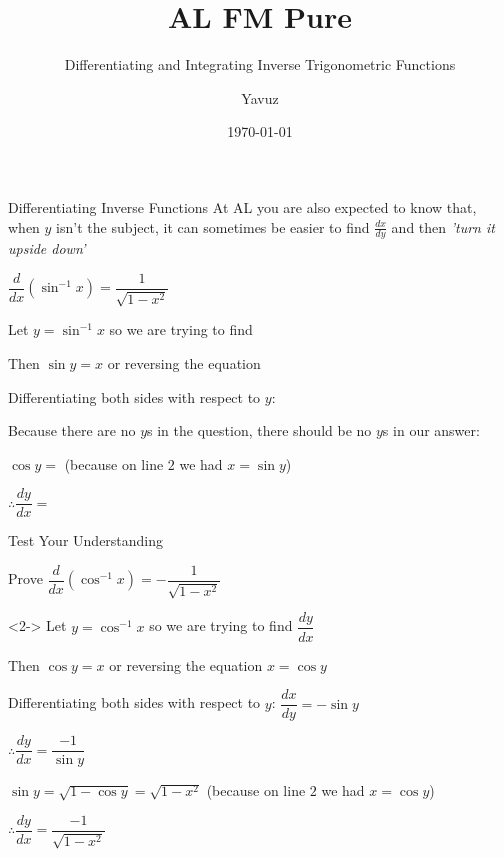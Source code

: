 \documentclass[8pt]{beamer}
\title[Pure]{{\color{aa}\Huge\adfbullet{9}}AL FM Pure}
\subtitle{Differentiating and Integrating Inverse Trigonometric Functions}
\author{Yavuz}
\date{\today}
\begin{document}
	
	\setlength{\abovedisplayskip}{0pt}
	\setlength{\belowdisplayskip}{0pt}
	\setlength{\abovedisplayshortskip}{0pt}
	\setlength{\belowdisplayshortskip}{0pt}
	
	\frame{\titlepage}
	
	
	\begin{frame}[shrink]{Differentiating Inverse Functions }
		\alert<1>{At AL you are also expected to know that, when $y$ isn't the subject, it can sometimes be easier to find $\frac{dx}{dy}$ and then \emph{'turn it upside down'}}
		
		\begin{definition}
			$\dfrac{d}{dx}\left( \sin ^{-1}x\right) =\dfrac{1}{\sqrt{1-x^{2}}}$
		\end{definition}
		
		Let $y = \sin ^{-1}x$ so we are trying to find 
		
		Then $\sin y = x$ or reversing the equation 
		
		Differentiating both sides with respect to $y$: 
		
		Because there are no $y$s in the question, there should be no $y$s in our answer: 
		
		$\cos y=$ (because on line $2$ we had $x = \sin y$)
		
		$\therefore\dfrac{dy}{dx}=$
	\end{frame}
	
	
	\begin{frame}[shrink]{Test Your Understanding}
		\begin{problem}
			Prove $\dfrac{d}{dx}\left( \cos ^{-1}x\right) =-\dfrac{1}{\sqrt{1-x^{2}}}$
		\end{problem}
		
		\begin{solution}<2->
			Let $y = \cos^{-1}x$ so we are trying to find $\dfrac{dy}{dx}$ 
			
			Then $\cos y = x$ or reversing the equation $x = \cos y$
			
			Differentiating both sides with respect to $y$: $\dfrac{dx}{dy} = -\sin y$
			
			$\therefore \dfrac{dy}{dx}=\dfrac{-1}{\sin y}$
			
			$\sin y=\sqrt{1-\cos y}=\sqrt{1-x^{2}}$ (because on line $2$ we had $x = \cos y$)
			
			$\therefore \dfrac{dy}{dx}=\dfrac{-1}{\sqrt{1-x^{2}}}$
			
		\end{solution}
	\end{frame}
	
\end{document}
